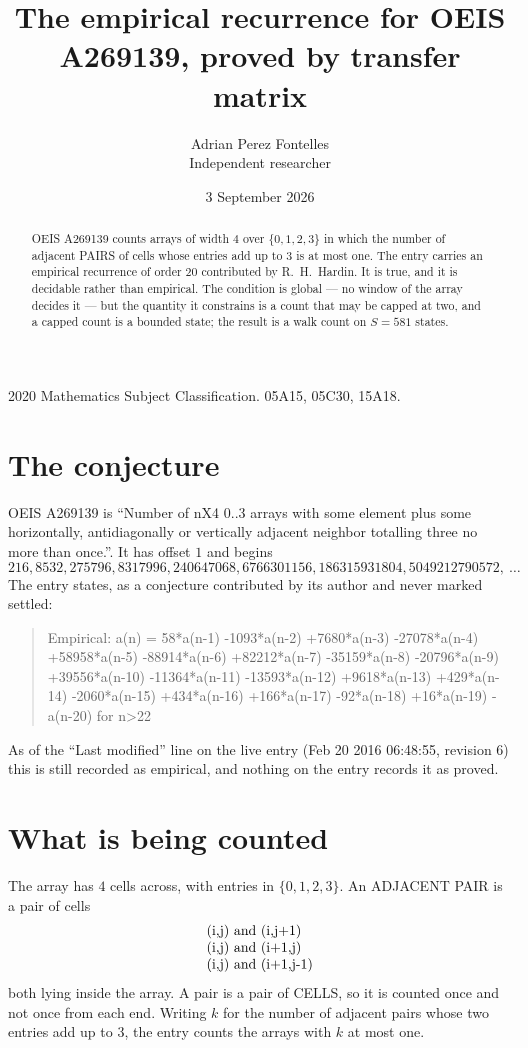 \documentclass[11pt,a4paper]{article}
\title{The empirical recurrence for OEIS A269139, proved by transfer matrix}
\author{Adrian Perez Fontelles\\ \small Independent researcher}
\date{3 September 2026}
\theoremstyle{plain}
\theoremstyle{definition}
\begin{document}
\maketitle

\begin{abstract}
OEIS A269139 counts arrays of width $4$ over $\{0,1,2,3\}$ in which the number of adjacent PAIRS of
cells whose entries add up to $3$ is at most one. The entry carries an empirical recurrence of
order $20$ contributed by R.~H.~Hardin. It is true, and it is decidable rather than
empirical. The condition is global --- no window of the array decides it --- but the quantity
it constrains is a count that may be capped at two, and a capped count is a bounded state; the
result is a walk count on $S=581$ states.
\end{abstract}

\noindent\small 2020 Mathematics Subject Classification. 05A15, 05C30, 15A18.\normalsize

\section{The conjecture}

OEIS A269139 is ``Number of nX4 0..3 arrays with some element plus some horizontally, antidiagonally or vertically adjacent neighbor totalling three no more than once.''. It has offset $1$ and begins
\[
216, 8532, 275796, 8317996, 240647068, 6766301156, 186315931804, 5049212790572,\ \dots
\]
The entry states, as a conjecture contributed by its author and never marked settled:
\begin{quote}
Empirical: a(n) = 58*a(n-1) -1093*a(n-2) +7680*a(n-3) -27078*a(n-4) +58958*a(n-5) -88914*a(n-6) +82212*a(n-7) -35159*a(n-8) -20796*a(n-9) +39556*a(n-10) -11364*a(n-11) -13593*a(n-12) +9618*a(n-13) +429*a(n-14) -2060*a(n-15) +434*a(n-16) +166*a(n-17) -92*a(n-18) +16*a(n-19) -a(n-20) for n>22
\end{quote}
As of the ``Last modified'' line on the live entry (Feb 20 2016 06:48:55, revision 6) this is still
recorded as empirical, and nothing on the entry records it as proved.

\section{What is being counted}

The array has $4$ cells across, with entries in $\{0,1,2,3\}$. An ADJACENT PAIR is a pair of cells
\[
\begin{array}{l}
$(i,j)\text{ and }(i,j{+}1)$ \\
$(i,j)\text{ and }(i{+}1,j)$ \\
$(i,j)\text{ and }(i{+}1,j{-}1)$ \\
\end{array}
\]
both lying inside the array. A pair is a pair of CELLS, so it is counted once and not once from
each end. Writing $k$ for the number of adjacent pairs whose two entries add up to $3$, the
entry counts the arrays with $k$ at most one.
\end{document}
